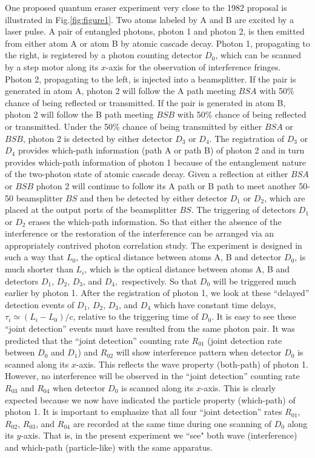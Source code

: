 \documentclass[pra,aps,epsf,12pt]{revtex4-2}
\begin{document}
One proposed quantum eraser experiment very close to the 1982 proposal is illustrated in
Fig.\ref{fig:figure1}. Two atoms labeled by A and B are excited by a laser pulse. A pair
of entangled photons, photon 1 and photon 2, is then emitted from either atom A or atom B
by atomic cascade decay. Photon 1, propagating to the right, is registered by a photon
counting detector $D_{0}$, which can be scanned by a step motor along its $x$-axis for
the observation of interference fringes. Photon 2, propagating to the left, is injected
into a beamsplitter. If the pair is generated in atom A, photon 2 will follow the A path
meeting $BSA$ with 50\% chance of being reflected or transmitted. If the pair is
generated in atom B, photon 2 will follow the B path meeting $BSB$ with 50\% chance of
being reflected or transmitted. Under the 50\% chance of being transmitted by either
$BSA$ or $BSB$, photon 2 is detected by either detector $D_{3}$ or $D_{4}$. The
registration of $D_{3}$ or $D_{4}$ provides which-path information (path A or path B) of
photon 2 and in turn provides which-path information of photon 1 because of the
entanglement nature of the two-photon state of atomic cascade decay. Given a reflection
at either $BSA$ or $BSB$ photon 2 will continue to follow its A path or B path to meet
another 50-50 beamsplitter $BS$ and then be detected by either detector $D_{1}$ or
$D_{2}$, which are placed at the output ports of the beamsplitter $BS$. The triggering of
detectors $D_{1}$ or $D_{2}$ erases the which-path information. So that either the
absence of the interference or the restoration of the interference can be arranged via an
appropriately contrived photon correlation study. The experiment is designed in such a
way that $L_{0}$, the optical distance between atoms A, B and detector $D_{0}$, is much
shorter than $L_{i}$, which is the optical distance between atoms A, B and detectors
$D_{1}$, $D_{2}$, $D_{3}$, and $D_{4},$ respectively. So that $D_{0}$ will be triggered
much earlier by photon 1. After the registration of photon 1, we look at these
``delayed'' detection events of $D_{1}$, $D_{2}$, $D_{3}$, and $D_{4}$ which have
constant time delays, $\tau _{i}\simeq (L_{i}-L_{0})/c$, relative to the triggering time
of $D_{0}$. It is easy to see these ``joint detection'' events must have resulted from
the same photon pair. It was predicted that the ``joint detection'' counting rate
$R_{01}$ (joint detection rate between $D_{0}$ and $D_{1}$) and $R_{02}$ will show
interference pattern when detector $D_{0}$ is scanned along its $x$-axis. This reflects
the wave property (both-path) of photon 1. However, no interference will be observed in
the ``joint detection'' counting rate $R_{03}$ and $R_{04}$ when detector $D_{0}$ is
scanned along its $x$-axis. This is clearly expected because we now have indicated the
particle property (which-path) of photon 1. It is important to emphasize
that all four ``joint detection'' rates $R_{01}$, $R_{02}$, $R_{03}$, and $%
R_{04}$ are recorded at the same time during one scanning of $D_{0}$ along its $y$-axis.
That is, in the present experiment we ``see" both wave (interference) and which-path
(particle-like) with the same apparatus.
\end{document}
